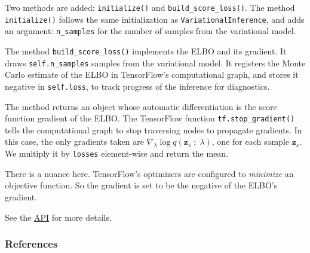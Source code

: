 Two methods are added: \texttt{initialize()} and
\texttt{build_score_loss()}.  The method \texttt{initialize()} follows
the same initialization as \texttt{VariationalInference}, and adds an
argument: \texttt{n_samples} for the number of samples from the
variational model.

The method \texttt{build_score_loss()} implements the ELBO and its
gradient. It draws \texttt{self.n_samples} samples from the
variational model. It registers the Monte Carlo
estimate of the ELBO in TensorFlow's computational graph, and stores it
negative in \texttt{self.loss}, to track progress of the inference for diagnostics.

The method returns an object whose automatic differentiation is the
score function gradient of the ELBO. The TensorFlow function
\texttt{tf.stop_gradient()} tells the computational graph to stop
traversing nodes to propagate gradients. In this case,
the only gradients taken are $\nabla_\lambda \log q(\mathbf{z}_s\;;\;\lambda)$,
one for each sample $\mathbf{z}_s$. We multiply it by \texttt{losses}
element-wise and return the mean.

There is a nuance here. TensorFlow's optimizers are configured to
\emph{minimize} an objective function. So the gradient is set to be
the negative of the ELBO's gradient.

See the \href{/api/}{API} for more details.

\subsubsection{References}\label{references}
